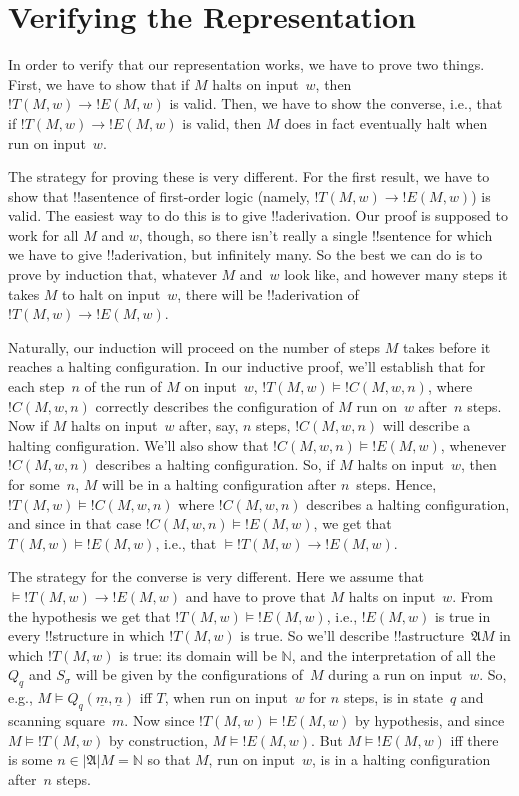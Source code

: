 \documentclass[10pt,a4paper]{article}
\theoremstyle{plain}
\theoremstyle{definition}
\theoremstyle{remark}
\newenvironment{explain}{}{}
\newcommand*{\olfileid}[3]{}
\newcommand*{\olsection}[1]{\section*{#1}}
\providecommand{\lif}{\mathbin{\rightarrow}}
\providecommand{\Entails}{\mathrel{\models}}
\providecommand{\Obj}{}
\providecommand{\Struct}{\ensuremath{\mathfrak{A}}}
\providecommand{\Domain}{\ensuremath{|\mathfrak{A}|}}
\providecommand{\Sat}[2]{\ensuremath{#1 \models #2}}
\providecommand{\num}[1]{\underline{#1}}
\providecommand{\Nat}{\ensuremath{\mathbb{N}}}
\begin{document}



\olfileid{tur}{und}{ver} 
\olsection{Verifying the Representation}

\begin{explain}
In order to verify that our representation works, we have to prove two
things. First, we have to show that if $M$ halts on input~$w$, then
$!T(M, w) \lif !E(M, w)$ is valid. Then, we have to show the converse,
i.e., that if $!T(M, w) \lif !E(M, w)$ is valid, then $M$ does in fact
eventually halt when run on input~$w$.

The strategy for proving these is very different. For the first
result, we have to show that !!a{sentence} of first-order logic
(namely, $!T(M, w) \lif !E(M, w)$) is valid. The easiest way to do
this is to give !!a{derivation}. Our proof is supposed to work for all
$M$ and $w$, though, so there isn't really a single !!{sentence} for
which we have to give !!a{derivation}, but infinitely many.  So the best
we can do is to prove by induction that, whatever $M$ and~$w$ look
like, and however many steps it takes $M$ to halt on input~$w$, there
will be !!a{derivation} of $!T(M, w) \lif !E(M, w)$.

Naturally, our induction will proceed on the number of steps $M$ takes
before it reaches a halting configuration. In our inductive proof,
we'll establish that for each step~$n$ of the run of $M$ on input~$w$,
$!T(M, w) \Entails !C(M, w, n)$, where $!C(M, w, n)$ correctly
describes the configuration of $M$ run on~$w$ after~$n$ steps. Now if
$M$ halts on input~$w$ after, say, $n$ steps, $!C(M, w, n)$ will
describe a halting configuration. We'll also show that $!C(M, w, n)
\Entails !E(M, w)$, whenever $!C(M, w, n)$ describes a halting
configuration.  So, if $M$ halts on input~$w$, then for some~$n$, $M$
will be in a halting configuration after $n$~steps. Hence, $!T(M, w)
\Entails !C(M, w, n)$ where $!C(M, w, n)$ describes a halting
configuration, and since in that case $!C(M, w, n) \Entails !E(M, w)$,
we get that $T(M, w) \Entails !E(M, w)$, i.e., that $\Entails !T(M, w)
\lif !E(M, w)$.

The strategy for the converse is very different. Here we assume that
$\Entails !T(M, w) \lif !E(M, w)$ and have to prove that $M$ halts on
input~$w$.  From the hypothesis we get that $!T(M, w) \Entails !E(M,
w)$, i.e., $!E(M, w)$ is true in every !!{structure} in which $!T(M,
w)$ is true. So we'll describe !!a{structure}~$\Struct{M}$ in which
$!T(M, w)$ is true: its domain will be $\Nat$, and the interpretation
of all the $\Obj Q_q$ and $\Obj S_\sigma$ will be given by the
configurations of~$M$ during a run on input~$w$.  So, e.g.,
$\Sat{M}{\Obj Q_q(\num{m}, \num{n})}$ iff $T$, when run on input~$w$
for $n$ steps, is in state~$q$ and scanning square~$m$.  Now since
$!T(M, w) \Entails !E(M, w)$ by hypothesis, and since $\Sat{M}{!T(M,
  w)}$ by construction, $\Sat{M}{!E(M, w)}$.  But $\Sat{M}{!E(M, w)}$
iff there is some $n \in \Domain{M} = \Nat$ so that $M$, run on
input~$w$, is in a halting configuration after~$n$ steps.
\end{explain}
\end{document}
